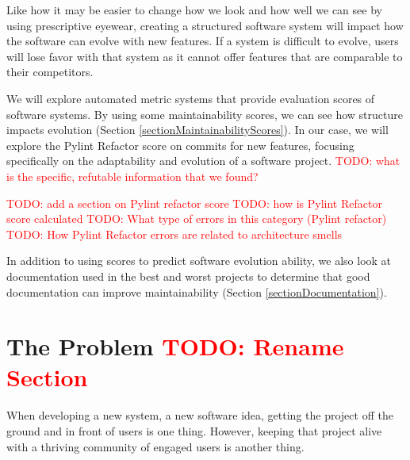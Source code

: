 \documentclass[12pt,conference]{IEEEtran}
\newcommand\todo[1]{\textcolor{red}{#1}}
\begin{document}
Like how it may be easier to change how we look and how well we can see by using prescriptive eyewear, creating a structured software system will impact how the software can evolve with new features. If a system is difficult to evolve, users will lose favor with that system as it cannot offer features that are comparable to their competitors.


We will explore automated metric systems that provide evaluation scores of software systems. By using some maintainability scores, we can see how structure impacts evolution (Section \ref{sectionMaintainabilityScores}). In our case, we will explore the Pylint Refactor score on commits for new features, focusing specifically on the adaptability and evolution of a software project. \todo{TODO: what is the specific, refutable information that we found?}

\todo{TODO: add a section on Pylint refactor score}
\todo{TODO: how is Pylint Refactor score calculated}
\todo{TODO: What type of errors in this category (Pylint refactor)}
\todo{TODO: How Pylint Refactor errors are related to architecture smells}

In addition to using scores to predict software evolution ability, we also look at documentation used in the best and worst projects to determine that good documentation can improve maintainability (Section \ref{sectionDocumentation}).


\vspace{0.5cm}
\section{The Problem \todo{TODO: Rename Section}}
\vspace{0.25cm}


When developing a new system, a new software idea, getting the project off the ground and in front of users is one thing. However, keeping that project alive with a thriving community of engaged users is another thing.
\end{document}
